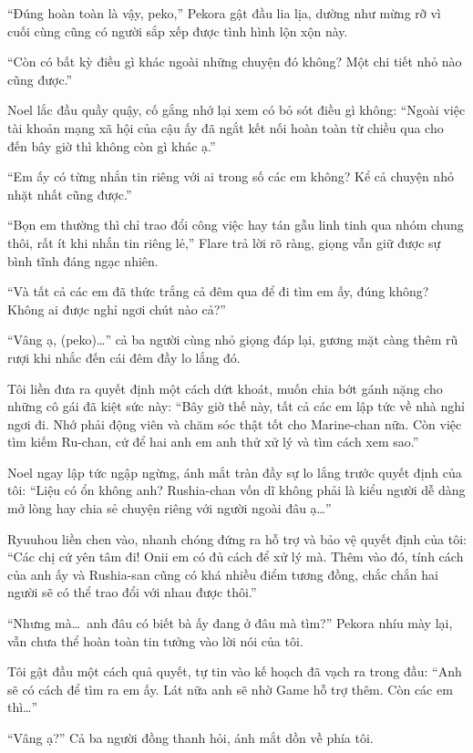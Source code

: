 \documentclass[../main.tex]{subfiles}
\begin{document}
``Đúng hoàn toàn là vậy, peko,'' Pekora gật đầu lia lịa, dường như mừng rỡ vì cuối cùng cũng có người sắp xếp được tình hình lộn xộn này.

``Còn có bất kỳ điều gì khác ngoài những chuyện đó không? Một chi tiết nhỏ nào cũng được.''

Noel lắc đầu quầy quậy, cố gắng nhớ lại xem có bỏ sót điều gì không: ``Ngoài việc tài khoản mạng xã hội của cậu ấy đã ngắt kết nối hoàn toàn từ chiều qua cho đến bây giờ thì không còn gì khác ạ.''

``Em ấy có từng nhắn tin riêng với ai trong số các em không? Kể cả chuyện nhỏ nhặt nhất cũng được.''

``Bọn em thường thì chỉ trao đổi công việc hay tán gẫu linh tinh qua nhóm chung thôi, rất ít khi nhắn tin riêng lẻ,'' Flare trả lời rõ ràng, giọng vẫn giữ được sự bình tĩnh đáng ngạc nhiên.

``Và tất cả các em đã thức trắng cả đêm qua để đi tìm em ấy, đúng không? Không ai được nghỉ ngơi chút nào cả?''

``Vâng ạ, (peko)\dots'' cả ba người cùng nhỏ giọng đáp lại, gương mặt càng thêm rũ rượi khi nhắc đến cái đêm đầy lo lắng đó.

Tôi liền đưa ra quyết định một cách dứt khoát, muốn chia bớt gánh nặng cho những cô gái đã kiệt sức này: ``Bây giờ thế này, tất cả các em lập tức về nhà nghỉ ngơi đi. Nhớ phải động viên và chăm sóc thật tốt cho Marine-chan nữa. Còn việc tìm kiếm Ru-chan, cứ để hai anh em anh thử xử lý và tìm cách xem sao.''

Noel ngay lập tức ngập ngừng, ánh mắt tràn đầy sự lo lắng trước quyết định của tôi: ``Liệu có ổn không anh? Rushia-chan vốn dĩ không phải là kiểu người dễ dàng mở lòng hay chia sẻ chuyện riêng với người ngoài đâu ạ\dots''

Ryuuhou liền chen vào, nhanh chóng đứng ra hỗ trợ và bảo vệ quyết định của tôi: ``Các chị cứ yên tâm đi! Onii em có đủ cách để xử lý mà. Thêm vào đó, tính cách của anh ấy và Rushia-san cũng có khá nhiều điểm tương đồng, chắc chắn hai người sẽ có thể trao đổi với nhau được thôi.''

``Nhưng mà\dots\ anh đâu có biết bà ấy đang ở đâu mà tìm?'' Pekora nhíu mày lại, vẫn chưa thể hoàn toàn tin tưởng vào lời nói của tôi.

Tôi gật đầu một cách quả quyết, tự tin vào kế hoạch đã vạch ra trong đầu: ``Anh sẽ có cách để tìm ra em ấy. Lát nữa anh sẽ nhờ Game hỗ trợ thêm. Còn các em thì\dots''

``Vâng ạ?'' Cả ba người đồng thanh hỏi, ánh mắt dồn về phía tôi.
\end{document}
